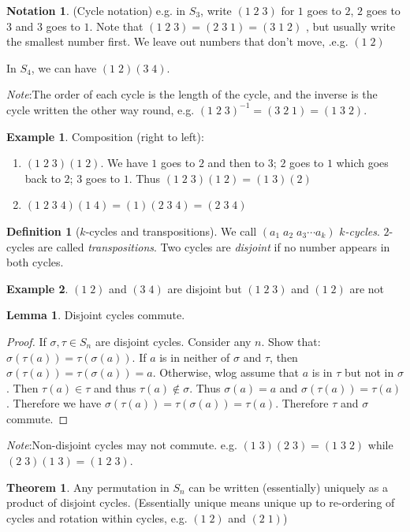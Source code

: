 \documentclass[a4paper]{article}
\theoremstyle{definition}
\newtheorem*{thm}{Theorem}
\newtheorem*{defi}{Definition}
\newtheorem*{eg}{Example}
\newtheorem*{lemma}{Lemma}
\newtheorem*{notation}{Notation}
\newcommand{\note}{\noindent \emph{Note}:\;}
\begin{document}
\begin{notation}
  (Cycle notation) e.g. in $S_3$, write $(1\;2\;3)$ for $1$ goes to $2$, $2$ goes to $3$ and $3$ goes to $1$. Note that $(1\; 2\; 3) = (2\; 3\; 1) = (3\; 1\; 2)$ , but usually write the smallest number first. We leave out numbers that don't move, .e.g. $(1\; 2)$

  In $S_4$, we can have $(1\; 2)(3\; 4)$.
\end{notation}
\note The order of each cycle is the length of the cycle, and the inverse is the cycle written the other way round, e.g. $(1\; 2\; 3)^{-1} = (3\; 2\; 1) = (1\; 3\; 2)$.

\begin{eg}
  Composition (right to left):
  \begin{enumerate}
  \item $(1\; 2\; 3)(1\; 2)$. We have $1$ goes to $2$ and then to $3$; $2$ goes to $1$ which goes back to $2$; $3$ goes to $1$. Thus $(1\; 2\; 3)(1\; 2) = (1\;3)(2)$
  \item $(1\; 2\; 3\; 4)(1\; 4) = (1)(2\; 3\; 4) = (2\; 3\; 4)$
\end{enumerate}
\end{eg}
\begin{defi}[$k$-cycles and transpositions]
  We call $(a_1\; a_2\; a_3\cdots a_k)$ \emph{$k$-cycles}. $2$-cycles are called \emph{transpositions}. Two cycles are \emph{disjoint} if no number appears in both cycles.
\end{defi}
\begin{eg}
  $(1\; 2)$ and $(3\; 4)$ are disjoint but $(1\; 2\; 3)$ and $(1\; 2)$ are not
\end{eg}
\begin{lemma}
  Disjoint cycles commute.
\end{lemma}
\begin{proof}
  If $\sigma, \tau\in S_n$ are disjoint cycles. Consider any $n$. Show that: $\sigma(\tau(a)) = \tau(\sigma(a))$. If $a$ is in neither of $\sigma$ and $\tau$, then $\sigma(\tau(a)) = \tau(\sigma(a)) = a$. Otherwise, wlog assume that $a$ is in $\tau$ but not in $\sigma$. Then $\tau(a)\in \tau$ and thus $\tau(a)\not\in \sigma$. Thus $\sigma(a) = a$ and $\sigma(\tau(a)) = \tau(a)$. Therefore we have $\sigma(\tau(a)) = \tau(\sigma(a)) = \tau(a)$. Therefore $\tau$ and $\sigma$ commute.
\end{proof}
\note Non-disjoint cycles may not commute. e.g. $(1\; 3)(2\; 3) = (1\; 3\; 2)$ while $(2\; 3)(1\; 3) = (1\; 2\; 3)$.

\begin{thm}
  Any permutation in $S_n$ can be written (essentially) uniquely as a product of disjoint cycles. (Essentially unique means unique up to re-ordering of cycles and rotation within cycles, e.g. $(1\; 2)$ and $(2\; 1)$)
\end{thm}
\end{document}
